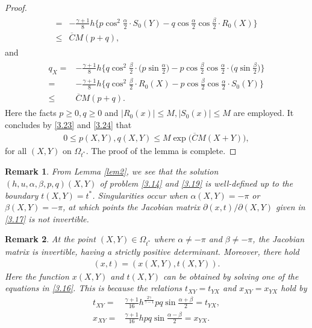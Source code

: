 \documentclass[11pt,reqno]{article}
\newtheorem{rem}{Remark}
\newcommand{\fr}{\frac}
\newcommand{\pa}{\partial}
\numberwithin{equation}{section}
\begin{document}
\begin{proof}
\begin{align}
\begin{split}
=&-\fr{\gamma+1}{8}h\bigg\{p\cos^2\frac{\alpha}{2}\cdot S_0(Y)  -q\cos\frac{\alpha}{2}\cos\frac{\beta}{2}\cdot R_0(X)\bigg\} \\
\leq & \overline{C}M(p+q),
\end{split}
\end{align}
and
\begin{align}\label{3.24}
\begin{split}
q_X=&-\fr{\gamma+1}{8}h\bigg\{q\cos^2\frac{\beta}{2}\cdot \Big(p\sin\frac{\alpha}{2}\Big) -p\cos\frac{\beta}{2}\cos\frac{\alpha}{2}\cdot\Big(q\sin\frac{\beta}{2}\Big)\bigg\} \\
=&-\fr{\gamma+1}{8}h\bigg\{q\cos^2\frac{\beta}{2}\cdot R_0(X) -p\cos\frac{\beta}{2}\cos\frac{\alpha}{2}\cdot S_0(Y)\bigg\} \\
\leq & \overline{C}M (p+q).
\end{split}
\end{align}
Here the facts $p\geq0, q\geq0$ and $|R_0(x)|\leq M, |S_0(x)|\leq M$ are employed. It concludes by \eqref{3.23} and \eqref{3.24} that
\begin{align}\label{3.25}
0\leq p(X,Y), q(X,Y)\leq M\exp\Big(\overline{C}M(X+Y)\Big),
\end{align}
for all $(X,Y)$ on $\Omega_{t^*}$. The proof of the lemma is complete.
\end{proof}

\begin{rem}\label{r2}
From Lemma \ref{lem2}, we see that the solution $(h, u, \alpha, \beta, p, q)(X,Y)$ of problem \eqref{3.14} and \eqref{3.19} is well-defined up to the boundary $t(X,Y)=t^*$. Singularities occur when $\alpha(X,Y)=-\pi$ or $\beta(X,Y)=-\pi$, at which points the Jacobian matrix $\pa(x,t)/\pa(X,Y)$ given in \eqref{3.17} is not invertible.
\end{rem}

\begin{rem}\label{r3}
At the point $(X, Y)\in \Omega_{t^*}$ where $\alpha\neq-\pi$ and $\beta\neq-\pi$, the Jacobian matrix is invertible, having a strictly positive determinant. Moreover, there hold
\begin{align}\label{3.26}
(x,t)=(x(X,Y), t(X,Y)).
\end{align}
Here the function $x(X,Y)$ and $t(X,Y)$ can be obtained by solving one of the equations in \eqref{3.16}. This is because the relations $t_{XY}=t_{YX}$ and $x_{XY}=x_{YX}$ hold by
\begin{align*}
t_{XY}=&\fr{\gamma+1}{16}h^{\fr{2\gamma}{\gamma-1}}pq\sin\fr{\alpha+\beta}{2}=t_{YX},\\[6pt]
x_{XY}=&\fr{\gamma+1}{16}hpq\sin\fr{\alpha-\beta}{2}=x_{YX}.
\end{align*}
\end{rem}
\end{document}

